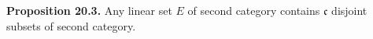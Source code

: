 \textbf{Proposition 20.3.} Any linear set $E$ of second category contains $\mathfrak{c}$ disjoint subsets of second category.
